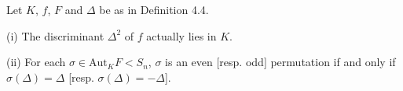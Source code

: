Let $K$, $f$, $F$ and $\Delta$ be as in Definition 4.4.

(i) The discriminant $\Delta^2$ of $f$ actually lies in $K$.

(ii) For each $\sigma \in \mathrm{Aut}_K F < S_n$, $\sigma$ is an even [resp. odd] permutation if and only if $\sigma(\Delta) = \Delta$ [resp. $\sigma(\Delta) = -\Delta$].
